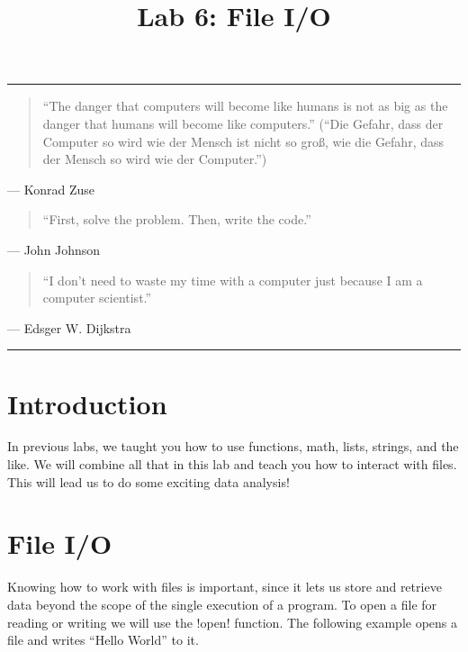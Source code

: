 \documentclass[11pt]{cselabheader}
\title{Lab 6: File I/O}
\begin{document}
\maketitle

\hrule
\begin{quotation}
``The danger that computers will become like humans is not as big as the danger
that humans will become like computers.'' (``Die Gefahr, dass der Computer so
wird wie der Mensch ist nicht so gro\ss, wie die Gefahr, dass der Mensch so wird
wie der Computer.'')
\end{quotation}
\begin{flushright}
--- Konrad Zuse
\end{flushright}

\begin{quotation}
	``First, solve the problem. Then, write the code.''
\end{quotation}
\begin{flushright}
	--- John Johnson
\end{flushright}

\begin{quotation}
``I don’t need to waste my time with a computer just because I am a computer
scientist.''
\end{quotation}
\begin{flushright}
--- Edsger W. Dijkstra
\end{flushright}

\hrule

\section{Introduction}
In previous labs, we taught you how to use functions, math, lists, strings, and
the like. We will combine all that in this lab and teach you how to interact
with files. This will lead us to do some exciting data analysis!

\pagebreak

\tableofcontents

\pagebreak
\section{File I/O}
Knowing how to work with files is important, since it lets us store and retrieve
data beyond the scope of the single execution of a program. To open a file for
reading or writing we will use the \pythoninline!open! function. The following
example opens a file and writes ``Hello World'' to it.
\end{document}

